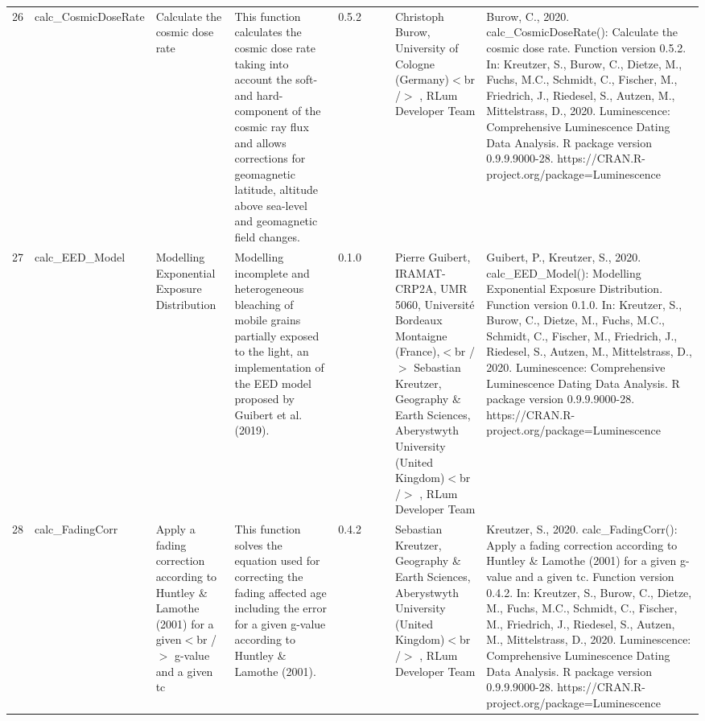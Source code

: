 \begin{table}[ht]
\begin{tabular}{rllllllll}
 \\ 
  26 & calc\_CosmicDoseRate & Calculate the cosmic dose rate & This function calculates the cosmic dose rate taking into account the soft- and hard-component of the cosmic ray flux and allows corrections for geomagnetic latitude, altitude above sea-level and geomagnetic field changes. & 0.5.2
 &  &  & Christoph Burow, University of Cologne (Germany)$<$br /$>$ , RLum Developer Team & Burow, C., 2020. calc\_CosmicDoseRate(): Calculate the cosmic dose rate. Function version 0.5.2. In: Kreutzer, S., Burow, C., Dietze, M., Fuchs, M.C., Schmidt, C., Fischer, M., Friedrich, J., Riedesel, S., Autzen, M., Mittelstrass, D., 2020. Luminescence: Comprehensive Luminescence Dating Data Analysis. R package version 0.9.9.9000-28. https://CRAN.R-project.org/package=Luminescence
 \\ 
  27 & calc\_EED\_Model & Modelling Exponential Exposure Distribution & Modelling incomplete and heterogeneous bleaching of mobile grains partially exposed to the light, an implementation of the EED model proposed by Guibert et al. (2019). & 0.1.0
 &  &  & Pierre Guibert, IRAMAT-CRP2A, UMR 5060, Université Bordeaux Montaigne (France),$<$br /$>$ Sebastian Kreutzer, Geography \& Earth Sciences, Aberystwyth University (United Kingdom)$<$br /$>$ , RLum Developer Team & Guibert, P., Kreutzer, S., 2020. calc\_EED\_Model(): Modelling Exponential Exposure Distribution. Function version 0.1.0. In: Kreutzer, S., Burow, C., Dietze, M., Fuchs, M.C., Schmidt, C., Fischer, M., Friedrich, J., Riedesel, S., Autzen, M., Mittelstrass, D., 2020. Luminescence: Comprehensive Luminescence Dating Data Analysis. R package version 0.9.9.9000-28. https://CRAN.R-project.org/package=Luminescence
 \\ 
  28 & calc\_FadingCorr & Apply a fading correction according to Huntley \& Lamothe (2001) for a given$<$br /$>$ g-value and a given tc & This function solves the equation used for correcting the fading affected age including the error for a given g-value according to Huntley \& Lamothe (2001). & 0.4.2
 &  &  & Sebastian Kreutzer, Geography \& Earth Sciences, Aberystwyth University (United Kingdom)$<$br /$>$ , RLum Developer Team & Kreutzer, S., 2020. calc\_FadingCorr(): Apply a fading correction according to Huntley \& Lamothe (2001) for a given g-value and a given tc. Function version 0.4.2. In: Kreutzer, S., Burow, C., Dietze, M., Fuchs, M.C., Schmidt, C., Fischer, M., Friedrich, J., Riedesel, S., Autzen, M., Mittelstrass, D., 2020. Luminescence: Comprehensive Luminescence Dating Data Analysis. R package version 0.9.9.9000-28. https://CRAN.R-project.org/package=Luminescence

\end{tabular}
\end{table}
